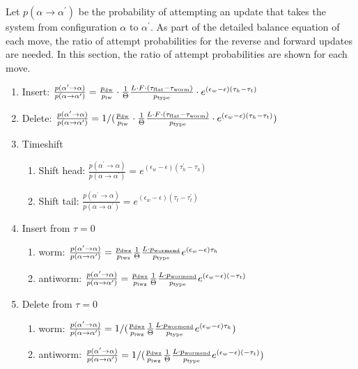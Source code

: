 \documentclass[12pt, two sided]{article}
\begin{document}
	Let $p(\alpha\to\alpha^\prime)$ be the probability of attempting an update that takes the system from configuration $\alpha$ to $\alpha^\prime$. As part of the detailed balance equation of each move, the ratio of attempt probabilities for the reverse and forward updates are needed. In this section, the ratio of attempt probabilities are shown for each move.
	\begin{enumerate}
	\setcounter{enumi}{0}
		\item Insert: $\frac{p(\alpha^\prime\to\alpha)}{p(\alpha\to\alpha^\prime)} = \frac{p_{\rm{dw}}}{p_{\rm{iw}}} \cdot \frac{1}{\Theta} \frac{L \cdot F \cdot (\tau_{\rm{flat}}-\tau_{\rm{worm}})}{p_{\rm{type}}} \cdot e^{(\epsilon_w-\epsilon)(\tau_h-\tau_t)}$
		
		\item Delete: $\frac{p(\alpha^\prime\to\alpha)}{p(\alpha\to\alpha^\prime)} = 1/(\frac{p_{\rm{dw}}}{p_{\rm{iw}}} \cdot \frac{1}{\Theta}  \frac{L \cdot F \cdot (\tau_{\rm{flat}}-\tau_{\rm{worm}})}{p_{\rm{type}}} \cdot e^{(\epsilon_w-\epsilon)(\tau_h-\tau_t)})$
		
		\item Timeshift
		\begin{enumerate}
		\item{Shift head: $\frac{p(\alpha^\prime\to\alpha)}{p(\alpha\to\alpha^\prime)} =  e^{(\epsilon_w-\epsilon)(\tau_h^\prime-\tau_h)}$}
		\item{Shift tail: $\frac{p(\alpha^\prime\to\alpha)}{p(\alpha\to\alpha^\prime)} = e^{(\epsilon_w-\epsilon)(\tau_t-\tau_t^\prime)}$}
		\end{enumerate}
		
		\item Insert from $\tau=0$
		\begin{enumerate}
		\item{worm: $\frac{p(\alpha^\prime\to\alpha)}{p(\alpha\to\alpha^\prime)} = \frac{p_{\rm{dwz}}}{p_{\rm{iwz}}} \frac{1}{\Theta}  \frac{L \cdot p_{\rm{wormend}}}{p_{\rm{type}}} e^{(\epsilon_w-\epsilon)\tau_h}$ }
		\item{antiworm: $\frac{p(\alpha^\prime\to\alpha)}{p(\alpha\to\alpha^\prime)} = \frac{p_{\rm{dwz}}}{p_{\rm{iwz}}} \frac{1}{\Theta}  \frac{L \cdot p_{\rm{wormend}}}{p_{\rm{type}}} e^{(\epsilon_w-\epsilon)(-\tau_t)}$}
		\end{enumerate}

		\item Delete from $\tau=0$
		\begin{enumerate}
		\item{worm: $\frac{p(\alpha^\prime\to\alpha)}{p(\alpha\to\alpha^\prime)} = 1/(\frac{p_{\rm{dwz}}}{p_{\rm{iwz}}} \frac{1}{\Theta}  \frac{L \cdot p_{\rm{wormend}}}{p_{\rm{type}}} e^{(\epsilon_w-\epsilon)\tau_h})$ }
		\item{antiworm: $\frac{p(\alpha^\prime\to\alpha)}{p(\alpha\to\alpha^\prime)}=1/(\frac{p_{\rm{dwz}}}{p_{\rm{iwz}}} \frac{1}{\Theta}  \frac{L \cdot p_{\rm{wormend}}}{p_{\rm{type}}} e^{(\epsilon_w-\epsilon)(-\tau_t)})$}
		\end{enumerate}
		

\end{enumerate}
\end{document}
